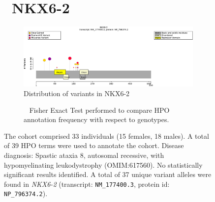 \begin{figure}[htbp]
    \section*{ NKX6-2}
    \centering
    \begin{subfigure}[b]{0.95\textwidth}
    \centering
    \includegraphics[width=\textwidth]{ img/NKX6-2_protein_diagram.pdf} 
    \captionsetup{justification=raggedright,singlelinecheck=false}
    \caption{Distribution of variants in NKX6-2}
    \end{subfigure}
    
    \vspace{2em}
    
    \begin{subfigure}[b]{0.95\textwidth}
    \centering
    \captionsetup{justification=raggedright,singlelinecheck=false}
    \caption{             Fisher Exact Test performed to compare HPO annotation frequency with respect to genotypes. }
    \end{subfigure}
    
    \vspace{2em}
    
    \caption{ The cohort comprised 33 individuals (15 females, 18 males). A total of 39 HPO terms were used to annotate the cohort. Disease diagnosis: Spastic ataxia 8, autosomal recessive, with hypomyelinating leukodystrophy (OMIM:617560). No statistically significant results identified. A total of 37 unique variant alleles were found in \textit{NKX6-2} (transcript: \texttt{NM\_177400.3}, protein id: \texttt{NP\_796374.2}).}
    \end{figure}
    